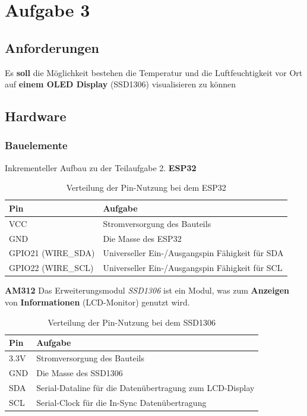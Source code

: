 \documentclass[9pt,a4paper]{report}
\begin{document}
	\chapter{Aufgabe 3}
	\section{Anforderungen}
	Es \textbf{soll} die Möglichkeit bestehen die Temperatur und die Luftfeuchtigkeit vor 
	Ort auf \textbf{einem OLED Display} (SSD1306) visualisieren zu können
	
	\section{Hardware}
	\subsection{Bauelemente}
	Inkrementeller Aufbau zu der Teilaufgabe 2.
	\newline
	\newline
	\textbf{ESP32}
	\renewcommand{\arraystretch}{1.5}
	\begin{table}[h!]
		\centering
		\caption{Verteilung der Pin-Nutzung bei dem ESP32}
		\label{tab:teil_3_steckbrett_esp32}
		\begin{tabular}{|l|l|} 
			\hline
			Pin & Aufgabe \\
			\hline
			VCC & Stromversorgung des Bauteils \\
			GND & Die Masse des ESP32 \\
			GPIO21 (WIRE\_SDA) & Universeller Ein-/Ausgangspin Fähigkeit für SDA \\
			GPIO22 (WIRE\_SCL) & Universeller Ein-/Ausgangspin Fähigkeit für SCL \\
			\hline
		\end{tabular}
	\end{table}
	\renewcommand{\arraystretch}{1}
	\newline
	\newline
	\textbf{AM312}
	\newline
	Das Erweiterungsmodul \textit{SSD1306} ist ein Modul, was zum \textbf{Anzeigen} von \textbf{Informationen} (LCD-Monitor) genutzt wird.
	\renewcommand{\arraystretch}{1.5}
	\begin{table}[h!]
		\centering
		\caption{Verteilung der Pin-Nutzung bei dem SSD1306}
		\label{tab:teil_3_steckbrett_ssd1306}
		\begin{tabular}{|l|l|}
			\hline
			Pin & Aufgabe \\
			\hline
			3.3V & Stromversorgung des Bauteils \\
			GND & Die Masse des SSD1306 \\
			SDA & Serial-Dataline für die Datenübertragung zum LCD-Display \\
			SCL & Serial-Clock für die In-Sync Datenübertragung \\
			\hline
		\end{tabular}
	\end{table}
	\renewcommand{\arraystretch}{1}
	
\end{document}
